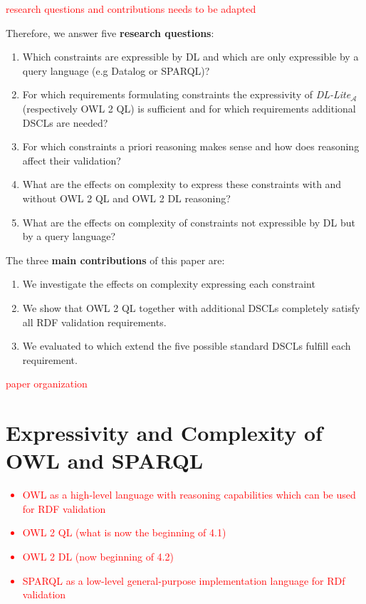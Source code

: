 \documentclass{llncs}
\begin{document}
\textcolor{red}{research questions and contributions needs to be adapted}

Therefore, we answer five \textbf{research questions}:
\begin{enumerate}
	\item Which constraints are expressible by DL and which are only expressible by a query language (e.g Datalog or SPARQL)?
	\item For which requirements formulating constraints the expressivity of \textit{DL-Lite}$_\mathcal{A}$ (respectively OWL 2 QL) is sufficient
	and for which requirements additional DSCLs are needed?
	\item For which constraints a priori reasoning makes sense and how does reasoning affect their validation?  
	\item What are the effects on complexity to express these constraints with and without OWL 2 QL and OWL 2 DL reasoning?
	\item What are the effects on complexity of constraints not expressible by DL but by a query language?
\end{enumerate}

The three \textbf{main contributions} of this paper are:
\begin{enumerate}
  \item We investigate the effects on complexity expressing each constraint
	\item We show that OWL 2 QL together with additional DSCLs completely satisfy all RDF validation requirements.
	\item We evaluated to which extend the five possible standard DSCLs fulfill each requirement.
\end{enumerate}

\textcolor{red}{paper organization}

\section{Expressivity and Complexity of OWL and SPARQL}

\textcolor{red}{
\begin{itemize}
	\item OWL as a high-level language with reasoning capabilities which can be used for RDF validation
  \item OWL 2 QL (what is now the beginning of 4.1)
  \item OWL 2 DL (now beginning of 4.2)
  \item SPARQL as a low-level general-purpose implementation language for RDf validation
\end{itemize}
}
\end{document}
